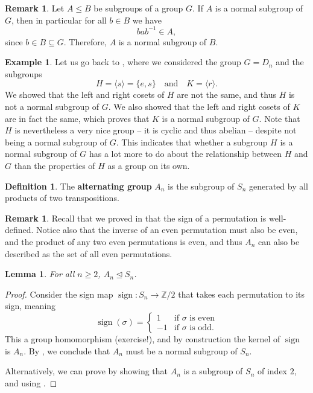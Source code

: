 \documentclass[12pt]{report}
\newtheorem{lemma}[theorem]{Lemma}
\numberwithin{equation}{section}
\numberwithin{theorem}{chapter}
\theoremstyle{definition}
\newtheorem{definition}[theorem]{Definition}
\newtheorem{example}[theorem]{Example}
\newtheorem*{basic properties}{Basic Properties}
\newtheorem*{Important Remark}{Important Remark}
\newtheorem{remark}[theorem]{Remark}
\newcommand{\df}[1]{{\bf #1}\index{#1}}
\DeclareMathOperator{\sign}{sign}
\begin{document}
\begin{remark}\label{normal subgroup is also normal in smaller group}
	Let $A \leq B$ be subgroups of a group $G$. If $A$ is a normal subgroup of $G$, then in particular for all $b \in B$ we have
	$$bab^{-1} \in A,$$
	since $b \in B \subseteq G$. Therefore, $A$ is a normal subgroup of $B$.
\end{remark}

\begin{example}\label{normal subgroups of D_n}
	Let us go back to , where we considered the group $G =D_{n}$ and the subgroups 
	$$H = \langle s \rangle = \{e,s\} \quad \textrm{and} \quad K = \langle r \rangle.$$
	We showed that the left and right cosets of $H$ are not the same, and thus $H$ is not a normal subgroup of $G$. We also showed that the left and right cosets of $K$ are in fact the same, which proves that $K$ is a normal subgroup of $G$. Note that $H$ is nevertheless a very nice group -- it is cyclic and thus abelian -- despite not being a normal subgroup of $G$. This indicates that whether a subgroup $H$ is a normal subgroup of $G$ has a lot more to do about the relationship between $H$ and $G$ than the properties of $H$ as a group on its own.
\end{example}


\begin{definition}
The \df{alternating group} $A_n$ is the subgroup of $S_n$ generated by all products of two transpositions.
\end{definition}


\begin{remark}
Recall that we proved in  that the sign of a permutation is well-defined. Notice also that the inverse of an even permutation must also be even, and the product of any two even permutations is even, and thus $A_n$ can also be described as the set of all even permutations.
\end{remark}


\begin{lemma}\label{A_n is normal}
	For all $n \geqslant 2$, $A_n\trianglelefteq S_n$.
\end{lemma}


\begin{proof}
Consider the sign map $\sign\!\!: S_n \to \mathbb{Z}/2$ that takes each permutation to its sign, meaning
$$\sign(\sigma) = \begin{cases}
	1 & \textrm{if $\sigma$ is even} \\
	-1 & \textrm{if $\sigma$ is odd}.
\end{cases}$$
This a group homomorphism (exercise!), and by construction the kernel of $\sign$ is $A_n$. By , we conclude that $A_n$ must be a normal subgroup of $S_n$.

Alternatively, we can prove  by showing that $A_n$ is a subgroup of $S_n$ of index $2$, and using .
\end{proof}
\end{document}
